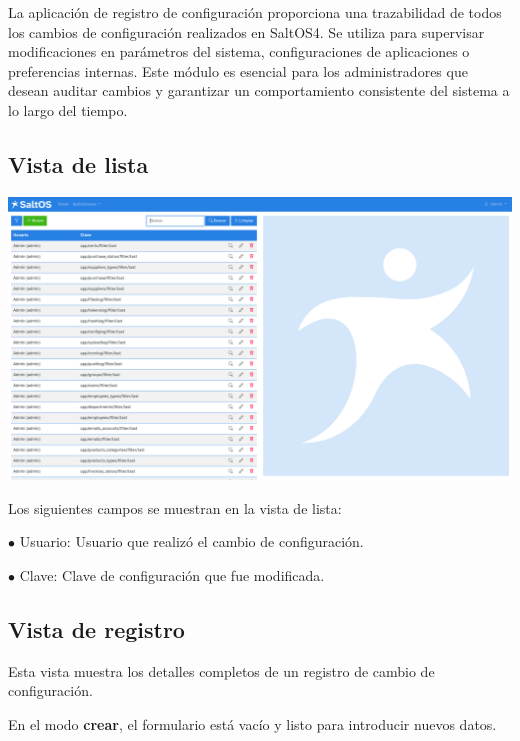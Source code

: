 \documentclass[a4paper]{article}
\begin{document}
La aplicación de registro de configuración proporciona una trazabilidad de todos los cambios de configuración realizados en SaltOS4.
Se utiliza para supervisar modificaciones en parámetros del sistema, configuraciones de aplicaciones o preferencias internas.
Este módulo es esencial para los administradores que desean auditar cambios y garantizar un comportamiento consistente del sistema a lo largo del tiempo.

\hypertarget{toc8}{}
\subsection{Vista de lista}

\begin{center}\includegraphics[width=1\textwidth]{../ujest/snaps/test-screenshots-js-screenshots-common-configlog-list-es-es-1-snap.png}\end{center}

Los siguientes campos se muestran en la vista de lista:

\begin{compactitem}
\item[\color{myblue}$\bullet$] Usuario: Usuario que realizó el cambio de configuración.
\item[\color{myblue}$\bullet$] Clave: Clave de configuración que fue modificada.
\end{compactitem}

\hypertarget{toc9}{}
\subsection{Vista de registro}

Esta vista muestra los detalles completos de un registro de cambio de configuración.

En el modo \textbf{crear}, el formulario está vacío y listo para introducir nuevos datos.
\end{document}

